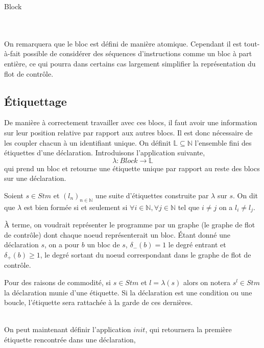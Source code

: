\documentclass[a4paper, 10pt]{article}
\begin{document}
\begin{dtype}{Block}
	\\
	\\
	\akind{\sskip}\\
\end{dtype}

On remarquera que le bloc est défini de manière atomique. Cependant il est tout-à-fait possible de considérer des séquences
d'instructions comme un bloc à part entière, ce qui pourra dans certains cas largement simplifier la représentation du flot
de contrôle.

\subsection{Étiquettage}
De manière à correctement travailler avec ces blocs, il faut avoir une information sur leur position relative par rapport
aux autres blocs. Il est donc nécessaire de les coupler chacun à un identifiant unique. 
On définit $\mathbb{L}\subseteq\mathbb{N}$ l'ensemble fini des étiquettes d'une déclaration. Introduisons l'application suivante,
\[
	\lambda: Block \longrightarrow \mathbb{L}
\]
\newline
qui prend un bloc et retourne une étiquette unique par rapport au reste des blocs sur une déclaration.
\newline
\newline
\begin{definition}
	Soient $s \in Stm$ et $(l_n)_{n\in\mathbb{N}}$ une suite d'étiquettes construite par $\lambda$ sur $s$.
	On dit que $\lambda$ est bien formée si et seulement si $\forall i \in \mathbb{N}, \forall j \in \mathbb{N}$ 
	tel que $i \neq j$ on a $l_i \neq l_j$.
\end{definition}
\newline
À terme, on voudrait représenter le programme par un graphe (le graphe de flot de contrôle) dont chaque noeud représenterait un bloc. 
Étant donné une déclaration $s$, on a pour  $b$ un bloc de $s$, $\delta_-(b) = 1$ le degré entrant et $\delta_+(b) \ge 1$, 
le degré sortant du noeud correspondant dans le graphe de flot de contrôle.
\\
\begin{notation}
	Pour des raisons de commodité, si $s \in Stm$ et $l = \lambda(s)$ alors on notera $s^l \in Stm$ la déclaration munie d'une étiquette.
	Si la déclaration est une condition ou une boucle, l'étiquette sera rattachée à la garde de ces dernières.
\end{notation}
\\
On peut maintenant définir l'application $init$, qui retournera la première étiquette rencontrée dans une déclaration,
\end{document}
